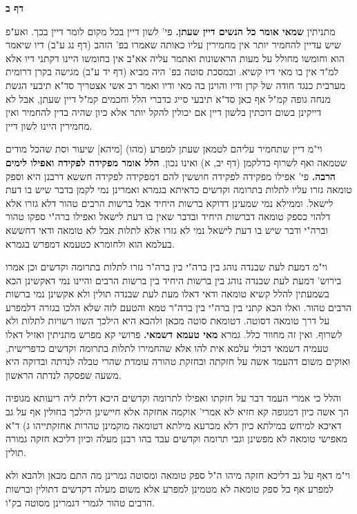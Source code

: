 \documentclass[12pt, openany]{book}
\newcommand{\sethebfont}{
\fontsize{10.5pt}{21.0pt} \selectfont
}
\newcommand{\twocol}[1]{
	{\sethebfont \begin{multicols}{2}
			#1
	\end{multicols}}	
}
\newcommand{\sectname}{}
\newcommand{\newsection}[1]{
	\renewcommand{\sectname}{#1}	
	\vspace{-\baselineskip}
	\begin{center}
		\textbf{%
\fontsize{16pt}{16pt}\selectfont
			#1}
	\end{center}
	\vspace{-\baselineskip}
	\nopagebreak
}
\begin{document}
\newsection{דף ב}
\twocol{מתניתין \textbf{שמאי אומר כל הנשים דיין שעתן.} פי' לשון דיין בכל מקום לומר דיין בכך. ואע"פ שיש עדיין להחמיר יותר אין מחמירין עליו כאותה שאמרו בפ' הזהב (דף נג ע"ב) דיו שיאמר הוא וחומשו מחולל על מעות הראשונות ואתמר עליה אא"ב אין בחומשו היינו דקתני דיו אלא למ"ד אין בו מאי דיו קשיא. ובמסכת סוטה בפ' היה מביא (דף יד ע"ב) מגישה בקרן דרומית מערבית כנגד חודה של קרן ודיו והוינן בה מאי ודיו ואמר רב אשי אצטריך סד"א תיבעי הגשת מנחה גופה קמ"ל אף כאן סד"א תיבעי סייג כדברי הלל וחכמים קמ"ל דיין שעתן, אבל לא דייקינן בשום דוכתין בלשון דיין אם יכולין להקל יותר אלא כיון שהיה בדין להחמיר ואין מחמירין היינו לשון דיין.\par וי"מ דיין שתחמיר עליהם לטמאן שעתן למפרע (מהו) [מיהא] שיעור וסת שהכל מודים שטמאה ואף לשרוף כדלקמן (דף יב, א) ואינו נכון. 
\textbf{הלל אומר מפקידה לפקידה ואפילו לימים הרבה.} פי' אפילו מפקידה לפקידה חוששין להם דמפקידה לפקידה חששא דרבנן היא וספק טומאה גזרו עליו לתלות בתרומה וקדשים כדאיתא בגמרא ואמרינן נמי לקמן בדבר שיש בו דעת לישאל. וממילא נמי שמעינן דדוקא ברשות היחיד אבל ברשות הרבים טהור דלא גזרו אלא דלהוי כספק טומאה דברשות היחיד ובדבר שאין בו דעת לישאל ואפילו ברה"י ספקו טהור וברה"י ודבר שיש בו דעת לישאל נמי לא גזרו אלא לתלות אבל לא טומאה ודאי דחששא בעלמא הוא ולחומרא כטעמא דמפרש בגמרא.\par וי"מ דמעת לעת שבנדה נוהג בין ברה"י בין ברה"ר גזרו לתלות בתרומה וקדשים וכן אמרו בירוש' דמעת לעת שבנדה נוהג בין ברשות היחיד בין ברשות הרבים והיינו נמי דאקשינן הכא בשמעתין להלל קשיא טומאה ודאי דאלו מעת לעת שבנדה תולין ולא אקשינן נמי ברשות הרבים טהור. ואלו הכא קתני בין ברה"י בין ברה"ר טמא והטעם לזה שלא הלכו בגזרה דלמפרע על דרך טומאה דסוטה. דטומאת סוטה מכאן ולהבא היא הילכך השוו רשויות לתלות ולא לשרוף. ואין זה מחוור כלל. 
גמרא \textbf{מאי טעמא דשמאי.} פרושי קא מפרש מתניתין ואזיל דאלו טעמיה דשמאי דכולי עלמא אית להו אלא שהחמירו לתלות בתרומה וקדשים כדפרישית, ואוקים משום דהעמד אשה על חזקתה ובחזקת טהורה עומדת שהרי טבלה לנדתה ובדוקה היא משעה שפסקה לנדתה הראשון.\par והלל כי אמרי העמד דבר על חזקתו ואפילו לתרומה וקדשים היכא דלית ליה ריעותא מגופיה הך אשה כיון דמגופה קא חזיא לא אמרי' אוקמה אחזקה אלא חיישינן הילכך בחולין אף על גב דאיכא למיחש במילתא כיון דלא מכרעא מילתא דטומאה מוקמינן טהרות אחזקתייהו ג) ד"א מאפישי טומאה לא מפשינן וגבי תרומה וקדשים עבד בהו רבנן מעלה וכיון דליכא חזקה גמורה תולין.\par וי"מ דאף על גב דליכא חזקה מיהו ה"ל ספק טומאה ומסוטה גמרינן מה התם מכאן ולהבא ולא למפרע אף כל ספק טומאה לא מטמינן למפרע אלא משום מעלה דקדשים דתולין וברשות הרבים טהור לגמרי דגמרינן מסוטה בק"ו. 
}
\end{document}
